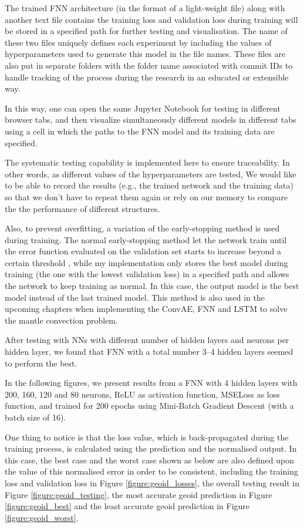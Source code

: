 The trained FNN architecture (in the format of a light-weight file) along with another text file contains the training loss and validation loss during training will be stored in a specified path for further testing and visualisation. The name of these two files uniquely defines each experiment by including the values of hyperparameters used to generate this model in the file names. These files are also put in separate folders with the folder name associated with commit IDs to handle tracking of the process during the research in an educated or extensible way.

In this way, one can open the same Jupyter Notebook for testing in different browser tabs, and then visualize simultaneously different models in different tabs using a cell in which the paths to the FNN model and its training data are specified. 

The systematic testing capability is implemented here to ensure traceability. In other words, as different values of the hyperparameters are tested, We would like to be able to record the results (e.g., the trained network and the training data) so that we don't have to repeat them again or rely on our memory to compare the the performance of different structures.

Also, to prevent overfitting, a variation of the early-stopping method is used during training. The normal early-stopping method let the network train until the error function evaluated on the validation set starts to increase beyond a certain threshold \citep{10.1007_978-3-642-35289-8_5}, while my implementation only stores the best model during training (the one with the lowest validation loss) in a specified path and allows the network to keep training as normal. In this case, the output model is the best model instead of the last trained model. This method is also used in the upcoming chapters when implementing the ConvAE, FNN and LSTM to solve the mantle convection problem.

After testing with NNs with different number of hidden layers and neurons per hidden layer, we found that FNN with a total number 3–4 hidden layers seemed to perform the best.

In the following figures, we present results from a FNN with 4 hidden layers with 200, 160, 120 and 80 neurons, ReLU as activation function, MSELoss as loss function, and trained for 200 epochs using Mini-Batch Gradient Descent (with a batch size of 16).

One thing to notice is that the loss value, which is back-propagated during the training process, is calculated using the prediction and the normalised output. In this case, the best case and the worst case shown as below are also defined upon the value of this normalised error in order to be consistent, including the training loss and validation loss in Figure \ref{figure:geoid_losses}, the overall testing result in Figure \ref{figure:geoid_testing},  the most accurate geoid prediction in Figure \ref{figure:geoid_best} and the least accurate geoid prediction in Figure \ref{figure:geoid_worst}.

